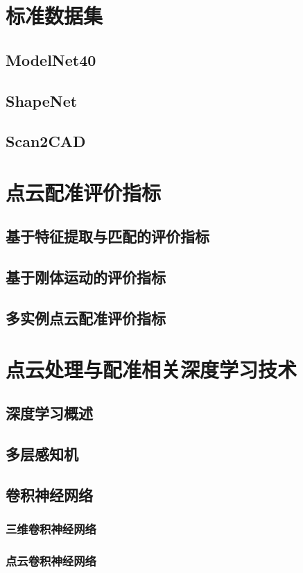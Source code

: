 \section{标准数据集}
\subsection{ModelNet40}
\subsection{ShapeNet}
\subsection{Scan2CAD}

\section{点云配准评价指标}
\subsection{基于特征提取与匹配的评价指标}
\subsection{基于刚体运动的评价指标}
\subsection{多实例点云配准评价指标}

\section{点云处理与配准相关深度学习技术}
\subsection{深度学习概述}
\subsection{多层感知机}
\subsection{卷积神经网络}
\subsubsection{三维卷积神经网络}
\subsubsection{点云卷积神经网络}
